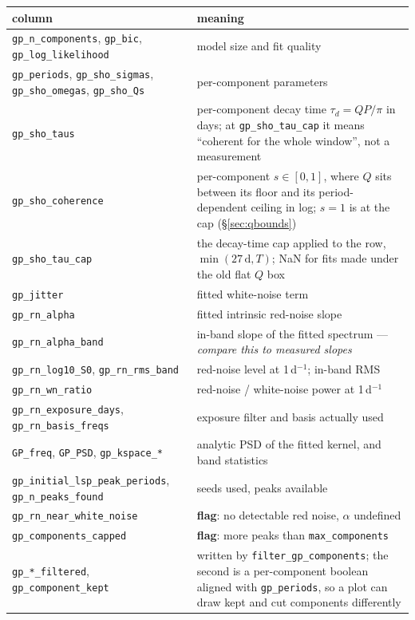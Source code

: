 \documentclass[11pt]{article}
\newcommand{\code}[1]{\texttt{#1}}
\begin{document}
\begin{center}
\begin{tabular}{ll}
\toprule
column & meaning \\
\midrule
\code{gp\_n\_components}, \code{gp\_bic}, \code{gp\_log\_likelihood} & model size and fit quality \\
\code{gp\_periods}, \code{gp\_sho\_sigmas}, \code{gp\_sho\_omegas}, \code{gp\_sho\_Qs} & per-component parameters \\
\code{gp\_sho\_taus} & per-component decay time $\tau_d = QP/\pi$ in days; at
   \code{gp\_sho\_tau\_cap} it means ``coherent for the whole window'', not a measurement \\
\code{gp\_sho\_coherence} & per-component $s \in [0,1]$, where $Q$ sits between its floor and
   its period-dependent ceiling in log; $s=1$ is at the cap (\S\ref{sec:qbounds}) \\
\code{gp\_sho\_tau\_cap} & the decay-time cap applied to the row, $\min(27\,\mathrm{d}, T)$;
   NaN for fits made under the old flat $Q$ box \\
\code{gp\_jitter} & fitted white-noise term \\
\code{gp\_rn\_alpha} & fitted intrinsic red-noise slope \\
\code{gp\_rn\_alpha\_band} & in-band slope of the fitted spectrum --- \emph{compare this to measured slopes} \\
\code{gp\_rn\_log10\_S0}, \code{gp\_rn\_rms\_band} & red-noise level at 1\,d$^{-1}$; in-band RMS \\
\code{gp\_rn\_wn\_ratio} & red-noise / white-noise power at 1\,d$^{-1}$ \\
\code{gp\_rn\_exposure\_days}, \code{gp\_rn\_basis\_freqs} & exposure filter and basis actually used \\
\code{GP\_freq}, \code{GP\_PSD}, \code{gp\_kspace\_*} & analytic PSD of the fitted kernel, and band statistics \\
\code{gp\_initial\_lsp\_peak\_periods}, \code{gp\_n\_peaks\_found} & seeds used, peaks available \\
\code{gp\_rn\_near\_white\_noise} & \textbf{flag}: no detectable red noise, $\alpha$ undefined \\
\code{gp\_components\_capped} & \textbf{flag}: more peaks than \code{max\_components} \\
\code{gp\_*\_filtered}, \code{gp\_component\_kept} & written by \code{filter\_gp\_components};
   the second is a per-component boolean aligned with \code{gp\_periods}, so a plot can draw
   kept and cut components differently \\
\bottomrule
\end{tabular}
\end{center}
\end{document}
